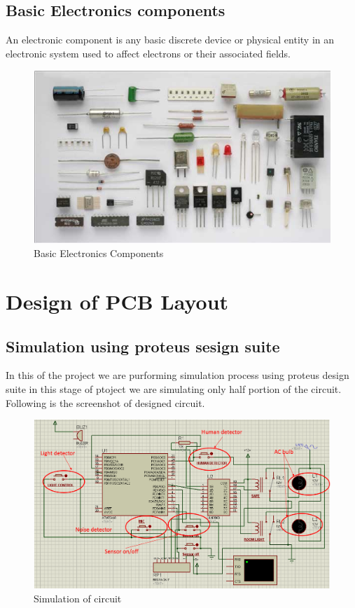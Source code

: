 \documentclass[twoside,a4paper,16pt]{book}
\begin{document}
{{\section{Basic Electronics components }
An electronic component is any basic discrete device or physical entity in an electronic system used to affect electrons or their associated fields.
\begin{figure}[ht!]
	\begin{center}
		\includegraphics[width=12.0cm]{20.jpg}
		\caption{Basic Electronics Components}
	\end{center}
\end{figure}
\chapter{Design of PCB Layout }
\section{Simulation using proteus sesign suite}
In this of the project we are purforming simulation process using proteus design suite in this stage of ptoject we are simulating only half portion of the circuit.
Following is the screenshot of designed circuit.
\begin{figure}[ht!]
	\begin{center}
		\includegraphics[width=17.0cm]{f4.png}
		\caption{Simulation of circuit}
	\end{center}
\end{figure}
\newpage
}}
\end{document}
